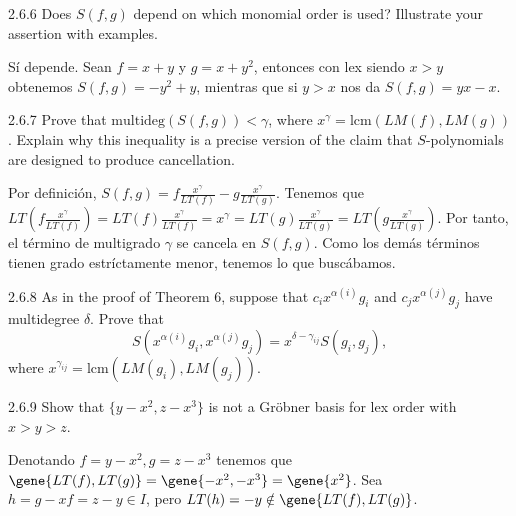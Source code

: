 \documentclass[twoside]{article}
\begin{document}
\newpage

\begin{ejercicio}{2.6.6}
Does $S( f , g)$ depend on which monomial order is used? Illustrate your assertion with
examples.
\end{ejercicio}
\begin{solucion}
Sí depende. Sean $f=x+y$ y $g=x+y^2$, entonces con lex siendo $x>y$ obtenemos $S(f,g)=-y^2+y$, mientras que si $y>x$ nos da $S(f,g)=yx-x$.
\end{solucion}

\newpage

\begin{ejercicio}{2.6.7}
Prove that $\mathrm{multideg}(S( f , g)) < γ$, where $x^γ = \mathrm{lcm}(LM( f ), LM(g))$. Explain why this
inequality is a precise version of the claim that $S$-polynomials are designed to produce
cancellation.
\end{ejercicio}
\begin{solucion}
Por definición, $S(f,g)=f\frac{x^{\gamma}}{LT(f)}-g\frac{x^{\gamma}}{LT(g)}$. Tenemos que $LT\left(f\frac{x^{\gamma}}{LT(f)}\right)=LT(f)\frac{x^{\gamma}}{LT(f)}=x^{\gamma}=LT(g)\frac{x^{\gamma}}{LT(g)}=LT\left(g\frac{x^{\gamma}}{LT(g)}\right)$. Por tanto, el término de multigrado $\gamma$ se cancela en $S(f,g)$. Como los demás términos tienen grado estríctamente menor, tenemos lo que buscábamos.
\end{solucion}

\newpage

\begin{ejercicio}{2.6.8}
As in the proof of Theorem 6, suppose that $c_ix^{α(i)}g_i$ and $c_jx^{α(j)}g_j$ have multidegree $δ$.
Prove that
$$S(x^{α(i)}g_i, x^{α(j)}g_j) = x^{δ−γ_{ij}}S(g_i, g_j),$$
where $x^{γ_{ij}} = \mathrm{lcm}(LM(g_i), LM(g_j))$.
\end{ejercicio}
\begin{solucion}

\end{solucion}

\newpage

\begin{ejercicio}{2.6.9}
Show that $\{y − x^2, z − x^3\}$ is not a Gröbner basis for lex order with $x > y > z$.
\end{ejercicio}
\begin{solucion}
Denotando $f=y − x^2,g=z − x^3$ tenemos que $\gene{LT(f),LT(g)}=\gene{-x^2,-x^3}=\gene{x^2}$. Sea $h=g-xf=z-y\in I$, pero $LT(h)=-y\notin\gene{LT(f),LT(g)}$.
\end{solucion}
\end{document}
